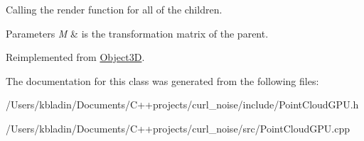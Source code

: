 Calling the render function for all of the children. 


\begin{DoxyParams}{Parameters}
{\em M} & is the transformation matrix of the parent. \\
\hline
\end{DoxyParams}


Reimplemented from \hyperlink{class_object3_d_afa3e765f12707f3dd0fb8d24de9a68b7}{Object3\-D}.



The documentation for this class was generated from the following files\-:\begin{DoxyCompactItemize}
\item 
/\-Users/kbladin/\-Documents/\-C++projects/curl\-\_\-noise/include/Point\-Cloud\-G\-P\-U.\-h\item 
/\-Users/kbladin/\-Documents/\-C++projects/curl\-\_\-noise/src/Point\-Cloud\-G\-P\-U.\-cpp\end{DoxyCompactItemize}
